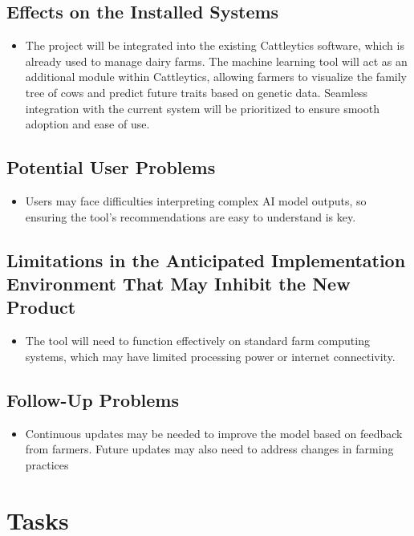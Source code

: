 \documentclass[12pt]{article}
\begin{document}
\subsection{Effects on the Installed Systems}
\begin{itemize}
	\item The project will be integrated into the existing Cattleytics software,
	      which is already used to manage dairy farms. The machine learning tool
	      will act as an additional module within Cattleytics, allowing farmers 
          to visualize the family tree of cows and predict future traits based 
          on genetic data. Seamless integration with the current system will be
	      prioritized to ensure smooth adoption and ease of use.
\end{itemize}
\subsection{Potential User Problems}
\begin{itemize}
	\item Users may face difficulties interpreting complex AI model outputs, so
	      ensuring the tool’s recommendations are easy to understand is key.
\end{itemize}
\subsection{Limitations in the Anticipated Implementation Environment That May
Inhibit the New Product}
\begin{itemize}
	\item The tool will need to function effectively on standard farm computing
	      systems, which may have limited processing power or internet
	      connectivity.
\end{itemize}
\subsection{Follow-Up Problems}
\begin{itemize}
	\item Continuous updates may be needed to improve the model based on 
    feedback from farmers. Future updates may also need to address changes in  
    farming practices
\end{itemize}

\section{Tasks}
\end{document}
